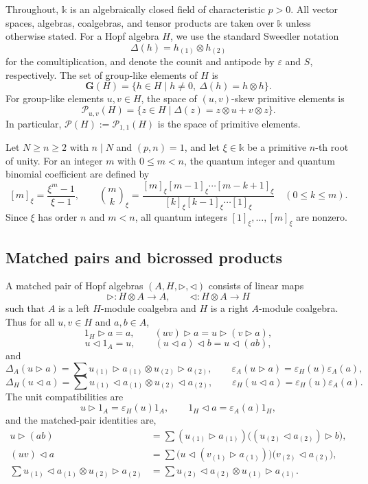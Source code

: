 \documentclass[twoside,11pt]{amsart}
\newcommand{\K}{\mathds{k}}
\newcommand{\G}{\mathbf{G}}
\newcommand{\Pp}{\mathcal{P}}
\begin{document}
	Throughout, $\K$ is an algebraically closed field of characteristic $p>0$.
	All vector spaces, algebras, coalgebras, and tensor products are taken over
	$\K$ unless otherwise stated. For a Hopf algebra $H$, we use the standard
	Sweedler notation
	\[
	\Delta(h)=h_{(1)}\otimes h_{(2)}
	\]
	for the comultiplication, and denote the counit and antipode by
	$\varepsilon$ and $S$, respectively. The set of group-like elements of $H$ is
	\[
	\G(H)=\{h\in H\mid h\ne0,\ \Delta(h)=h\otimes h\}.
	\]
	For group-like elements $u,v\in H$, the space of $(u,v)$-skew primitive
	elements is
	\[
	\mathcal P_{u,v}(H)=\{z\in H\mid \Delta(z)=z\otimes u+v\otimes z\}.
	\]
	In particular, $\Pp(H):=\Pp_{1,1}(H)$ is the space of primitive elements.
	
	Let $N\ge n\ge2$ with $n\mid N$ and $(p,n)=1$, and let $\xi\in\K$ be a
	primitive $n$-th root of unity. For an integer $m$ with $0\le m<n$, the
	quantum integer and quantum binomial coefficient are defined by
	\[
	[m]_{\xi}=\frac{\xi^m-1}{\xi-1},
	\qquad
	\binom{m}{k}_{\xi}
	=\frac{[m]_{\xi}[m-1]_{\xi}\cdots[m-k+1]_{\xi}}
	{[k]_{\xi}[k-1]_{\xi}\cdots[1]_{\xi}}
	\quad(0\le k\le m).
	\]
	Since $\xi$ has order $n$ and $m<n$, all quantum integers
	$[1]_{\xi},\dots,[m]_{\xi}$ are nonzero.
	
	
	
	
	
	
	\subsection{Matched pairs and bicrossed products}
	A matched pair of Hopf algebras $(A,H,\triangleright,\triangleleft)$ consists
	of linear maps
	\[
	\triangleright:H\otimes A\to A,
	\qquad
	\triangleleft:H\otimes A\to H
	\]
	such that $A$ is a left $H$-module coalgebra and $H$ is a right
	$A$-module coalgebra. Thus for all $u,v\in H$ and $a,b\in A$, 
	\[
	1_H\triangleright a=a,
	\qquad
	(uv)\triangleright a=u\triangleright(v\triangleright a),
	\]
	\[
	u\triangleleft1_A=u,
	\qquad
	(u\triangleleft a)\triangleleft b=u\triangleleft(ab),
	\]
	and
	\[
	\Delta_A(u\triangleright a)
	=\sum u_{(1)}\triangleright a_{(1)}
	\otimes u_{(2)}\triangleright a_{(2)},
	\qquad
	\varepsilon_A(u\triangleright a)
	=\varepsilon_H(u)\varepsilon_A(a),
	\]
	\[
	\Delta_H(u\triangleleft a)
	=\sum u_{(1)}\triangleleft a_{(1)}
	\otimes u_{(2)}\triangleleft a_{(2)},
	\qquad
	\varepsilon_H(u\triangleleft a)
	=\varepsilon_H(u)\varepsilon_A(a).
	\]
	The unit compatibilities are
	\[
	u\triangleright1_A=\varepsilon_H(u)1_A,
	\qquad
	1_H\triangleleft a=\varepsilon_A(a)1_H,
	\]
	and the matched-pair identities are, 
	\begin{align}
		u\triangleright(ab)
		&=\sum (u_{(1)}\triangleright a_{(1)})
		\bigl((u_{(2)}\triangleleft a_{(2)})\triangleright b\bigr),
		\tag{MP1}\label{eq:MP1}\\
		(uv)\triangleleft a
		&=\sum
		\bigl(u\triangleleft(v_{(1)}\triangleright a_{(1)})\bigr)
		\bigl(v_{(2)}\triangleleft a_{(2)}\bigr),
		\tag{MP2}\label{eq:MP2}\\
		\sum u_{(1)}\triangleleft a_{(1)}\otimes
		u_{(2)}\triangleright a_{(2)}
		&=\sum u_{(2)}\triangleleft a_{(2)}\otimes
		u_{(1)}\triangleright a_{(1)}.
		\tag{MP3}\label{eq:MP3}
	\end{align}
	
\end{document}
